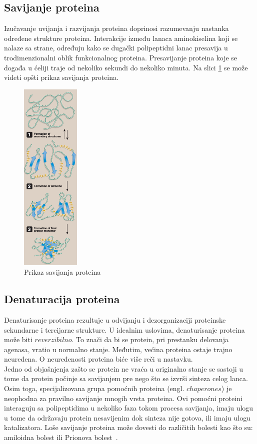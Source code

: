 \subsection{Savijanje proteina}
Izučavanje uvijanja i razvijanja proteina doprinosi razumevanju nastanka određene strukture proteina. Interakcije između lanaca aminokiselina koji se nalaze sa strane, određuju kako se dugački polipeptidni lanac presavija u trodimenzionalni oblik funkcionalnog proteina. Presavijanje proteina koje se događa u ćeliji traje od nekoliko sekundi do nekoliko minuta. 
Na slici \ref{fig:folding} se može videti opšti prikaz savijanja proteina.
\begin{figure}[h]
	\centering
    \includegraphics[width=0.25\textwidth]{Figures/BO/protein_folding.png}
    \caption{Prikaz savijanja proteina~\cite{lippincott}}
    \label{fig:folding}
\end{figure}


\subsection{Denaturacija proteina}
Denaturisanje proteina rezultuje u odvijanju i dezorganizaciji proteinske sekundarne i tercijarne strukture. U idealnim uslovima, denaturisanje proteina može biti $reverzibilno$. To znači da bi se protein, pri prestanku delovanja agenasa, vratio u normalno stanje. Međutim, većina proteina ostaje trajno neuređena. O neuređenosti proteina biće više reči u nastavku.\\
Jedno od objašnjenja zašto se protein ne vraća u originalno stanje se sastoji u tome da protein počinje sa savijanjem pre nego što se izvrši sinteza celog lanca. Osim toga, specijalizovana grupa pomoćnih proteina (engl. $chaperones$) je neophodna za pravilno savijanje mnogih vrsta proteina. Ovi pomoćni proteini interaguju sa polipeptidima u nekoliko faza tokom procesa savijanja, imaju ulogu u tome da održavaju protein nesavijenim dok sinteza nije gotova, ili imaju ulogu katalizatora. Loše savijanje proteina može dovesti do različitih bolesti kao što su: amiloidna bolest ili Prionova bolest~\cite{lippincott}.


